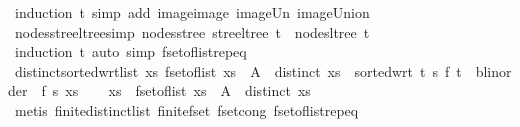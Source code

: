 \begin{isabellebody}
\ {\isacharparenleft}{\kern0pt}induction\ t{\isacharparenright}{\kern0pt}\ {\isacharparenleft}{\kern0pt}simp\ add{\isacharcolon}{\kern0pt}\ image{\isacharunderscore}{\kern0pt}image\ image{\isacharunderscore}{\kern0pt}Un\ image{\isacharunderscore}{\kern0pt}Union{\isacharparenright}{\kern0pt}%
\endisatagproof
{\isafoldproof}%
%
\isadelimproof
\isanewline
%
\endisadelimproof
\isanewline
{}\isamarkupfalse%
\ nodes{\isacharunderscore}{\kern0pt}stree{\isacharunderscore}{\kern0pt}ltree{\isacharbrackleft}{\kern0pt}simp{\isacharbrackright}{\kern0pt}{\isacharcolon}{\kern0pt}\ {\isachardoublequoteopen}nodes{\isacharunderscore}{\kern0pt}stree\ {\isacharparenleft}{\kern0pt}stree{\isacharunderscore}{\kern0pt}ltree\ t{\isacharparenright}{\kern0pt}\ {\isacharequal}{\kern0pt}\ nodes{\isacharunderscore}{\kern0pt}ltree\ t{\isachardoublequoteclose}\isanewline
%
\isadelimproof
\ \ %
\endisadelimproof
%
\isatagproof
{}\isamarkupfalse%
\ {\isacharparenleft}{\kern0pt}induction\ t{\isacharparenright}{\kern0pt}\ {\isacharparenleft}{\kern0pt}auto\ simp{\isacharcolon}{\kern0pt}\ fset{\isacharunderscore}{\kern0pt}of{\isacharunderscore}{\kern0pt}list{\isachardot}{\kern0pt}rep{\isacharunderscore}{\kern0pt}eq{\isacharparenright}{\kern0pt}%
\endisatagproof
{\isafoldproof}%
%
\isadelimproof
\isanewline
%
\endisadelimproof
\isanewline
{}\isamarkupfalse%
\ distinct{\isacharunderscore}{\kern0pt}sorted{\isacharunderscore}{\kern0pt}wrt{\isacharunderscore}{\kern0pt}list{\isacharcolon}{\kern0pt}\ {\isachardoublequoteopen}{\isasymexists}xs{\isachardot}{\kern0pt}\ fset{\isacharunderscore}{\kern0pt}of{\isacharunderscore}{\kern0pt}list\ xs\ {\isacharequal}{\kern0pt}\ A\ {\isasymand}\ distinct\ xs\ {\isasymand}\ sorted{\isacharunderscore}{\kern0pt}wrt\ {\isacharparenleft}{\kern0pt}{\isasymlambda}t\ s{\isachardot}{\kern0pt}\ {\isacharparenleft}{\kern0pt}f\ t\ {\isacharcolon}{\kern0pt}{\isacharcolon}{\kern0pt}\ {\isacharprime}{\kern0pt}b{\isacharcolon}{\kern0pt}{\isacharcolon}{\kern0pt}linorder{\isacharparenright}{\kern0pt}\ {\isasymle}\ f\ s{\isacharparenright}{\kern0pt}\ xs{\isachardoublequoteclose}\isanewline
%
\isadelimproof
%
\endisadelimproof
%
\isatagproof
{}\isamarkupfalse%
{\isacharminus}{\kern0pt}\isanewline
\ \ \isamarkupfalse%
\ xs\ \ {\isachardoublequoteopen}fset{\isacharunderscore}{\kern0pt}of{\isacharunderscore}{\kern0pt}list\ xs\ {\isacharequal}{\kern0pt}\ A\ {\isasymand}\ distinct\ xs{\isachardoublequoteclose}\isanewline
\ \ \ \ \isamarkupfalse%
\ {\isacharparenleft}{\kern0pt}metis\ finite{\isacharunderscore}{\kern0pt}distinct{\isacharunderscore}{\kern0pt}list\ finite{\isacharunderscore}{\kern0pt}fset\ fset{\isacharunderscore}{\kern0pt}cong\ fset{\isacharunderscore}{\kern0pt}of{\isacharunderscore}{\kern0pt}list{\isachardot}{\kern0pt}rep{\isacharunderscore}{\kern0pt}eq{\isacharparenright}{\kern0pt}\isanewline

\end{isabellebody}
